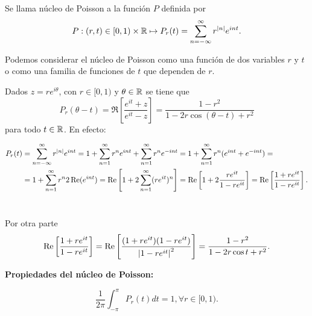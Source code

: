 \begin{definition}
    Se llama núcleo de Poisson a la función $P$ definida por
    \begin{equation}
        \label{poisson1}
        P:(r,t) \in [0,1)\times \mathbb{R} \mapsto P_r(t) = \sum_{n=-\infty}^{\infty} r^{\left\lvert n\right\rvert}e^{int}.
    \end{equation}

    Podemos considerar el núcleo de Poisson como una función de dos variables $r$ y $t$ o como una familia de funciones de $t$ que dependen de $r$.

    Dados $z=re^{i \theta}$, con $r \in [0,1)$ y $\theta \in \mathbb{R}$ se tiene que
    \begin{equation}
        \label{poisson2}
        P_r(\theta - t) = \Re \left[ \dfrac{e^{it} + z}{e^{it} - z} \right] = \dfrac{1 - r^2}{1 - 2r \cos (\theta - t) + r^2}
    \end{equation}
    para todo $t \in \mathbb{R}$. En efecto:

    \begin{equation*}
        \begin{split}
            P_r(t) & = \sum_{n=-\infty}^{\infty} r^{\left\lvert n\right\rvert}e^{int} = 1 + \sum_{n=1}^{\infty} r^n e^{int} + \sum_{n=1}^{\infty} r^n e^{-int} = 1 + \sum_{n=1}^{\infty} r^n (e^{int} + e^{-int}) = \\
                   & =  1 + \sum_{n=1}^{\infty} r^n 2 \operatorname{Re}(e^{int}) = \operatorname{Re} \left[ 1 + 2 \sum_{n=1}^{\infty} (r e^{it})^n  \right] = \operatorname{Re} \left[ 1 + 2 \dfrac{re^{it}}{1-re^{it}} \right] = \operatorname{Re} \left[\dfrac{1 + re^{it}}{1-re^{it}} \right].
        \end{split}
    \end{equation*}
    \\ \par
    Por otra parte
    \begin{equation*}
        \operatorname{Re} \left[ \dfrac{1 + re^{it}}{1-re^{it}} \right] = \operatorname{Re} \left[ \dfrac{(1 + re^{it})(1 - re^{it})}{\left\lvert1-re^{it}\right\rvert^2} \right] = \dfrac{1 - r^2}{1 - 2r \cos t + r^2}.
    \end{equation*}
\end{definition}

\newpage

\textbf{Propiedades del núcleo de Poisson:}%

\begin{equation}
    \dfrac{1}{2 \pi} \int_{- \pi}^{\pi} P_r (t) dt = 1, \forall r \in [0,1).
\end{equation}

